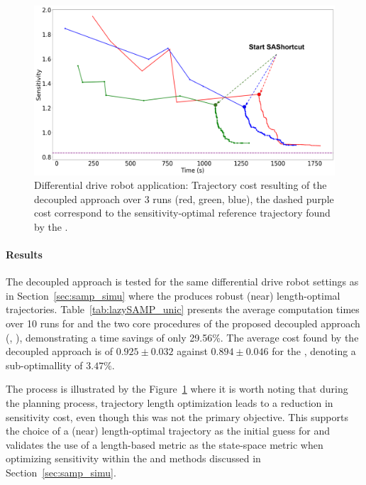 

\begin{figure}[h!]
    \centering
    \includegraphics[width=0.7\linewidth]{figures/samp/sensi_cost_unic.png}
    \caption{Differential drive robot application: Trajectory cost resulting of the decoupled approach over 3 runs (red, green, blue), the dashed purple cost correspond to the sensitivity-optimal reference trajectory found by the .}
    \label{fig:sensi_cost_unic}
\end{figure}

\paragraph{Results}

The decoupled approach is tested for the same differential drive robot settings as in Section~\ref{sec:samp_simu} where the  produces robust (near) length-optimal trajectories.
Table~\ref{tab:lazySAMP_unic} presents the average computation times over 10 runs for  and the two core procedures of the proposed decoupled approach (, ), demonstrating a time savings of only 29.56\%.
The average cost found by the decoupled approach is of $0.925 \pm 0.032$ against $0.894 \pm 0.046$ for the , denoting a sub-optimallity of $3.47\%$.

The process is illustrated by the Figure~\ref{fig:sensi_cost_unic} where it is worth noting that during the  planning process, trajectory length optimization leads to a reduction in sensitivity cost, even though this was not the primary objective. 
This supports the choice of a (near) length-optimal trajectory as the initial guess for  and validates the use of a length-based metric as the state-space metric when optimizing sensitivity within the  and  methods discussed in Section~\ref{sec:samp_simu}.

